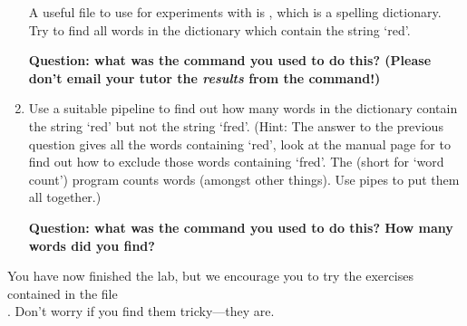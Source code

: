 \begin{enumerate}
A useful file to use for experiments with  is
, which is a spelling dictionary. Try to
find all words
in the dictionary which contain the string `red'.

  \textbf{Question: what was the command you used to do this? (Please don't email your
  tutor the \emph{results} from the command!)}

\item
  Use a suitable pipeline to find out how many
  words in the dictionary contain the string `red' but not the
  string `fred'.  (Hint: The answer to the previous question gives all
  the words containing `red', look at the manual page for
   to find out how to exclude those words containing
  `fred'. The  (short for `word count') program counts words
  (amongst other things). Use pipes to put them all together.)

  \textbf{Question: what was the command you used to do this? How many words did you find?}

\end{enumerate}

You have now finished the lab, but we encourage you to try the exercises
contained in the file \\. Don't worry if you find them
tricky---they are.

